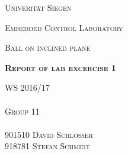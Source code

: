 \documentclass[12pt,a4paper]{article}
\begin{document}
\begin{titlepage}
	\begin{center}
	{\scshape\LARGE Univerität Siegen \par}
	\vspace{3cm}
	{\scshape\LARGE Embedded Control Laboratory \par}
	\vspace{1cm}
	{\scshape\Large Ball on inclined plane \par}
	\vspace{5cm}
	{\scshape\Large\bfseries Report of lab excercise 1 \par}
	\vfill
	\end{center}
	{\scshape WS 2016/17\\ \\ Group 11\\ \\ 901510 David Schlosser\\ 918781 Stefan Schmidt \par}	
\end{titlepage}
\pagestyle{fancy}
\onehalfspacing
\tableofcontents
\newpage



\end{document}
